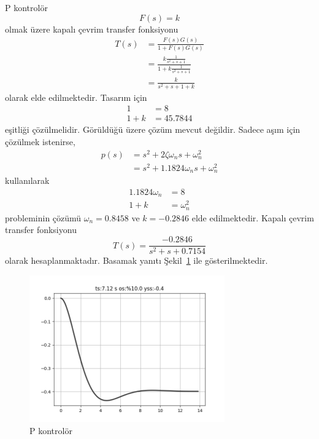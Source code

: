 P kontrolör
\begin{equation}
    F(s)=k
\end{equation}
olmak üzere kapalı çevrim transfer fonksiyonu 
\begin{equation}
\begin{split}
    T(s)&=\frac{F(s)G(s)}{1+F(s)G(s)}\\
    &=\frac{k\frac{1}{s^2+s+1}}{1+k\frac{1}{s^2+s+1}}\\
    &=\frac{k}{s^2+s+1+k}
\end{split}
\end{equation}
olarak elde edilmektedir. Tasarım için 
\begin{equation}
\begin{split}
    1&=8\\
    1+k&=45.7844
\end{split}
\end{equation}
eşitliği çözülmelidir. Görüldüğü üzere çözüm mevcut değildir. Sadece aşım için çözülmek istenirse, \begin{equation}
\begin{split}
    p(s)&=s^2+2\zeta \omega_n s+\omega_n^2\\
    &=s^2+1.1824\omega_n s+\omega_n^2
\end{split}
\end{equation}
kullanılarak 
\begin{equation}
\begin{split}
    1.1824\omega_n&=8\\
    1+k&=\omega_n^2
\end{split}
\end{equation}
probleminin çözümü $\omega_n=0.8458$ ve $k=-0.2846$ elde edilmektedir. Kapalı çevrim transfer fonksiyonu
\begin{equation}
    T(s)=\frac{-0.2846}{s^2 + s + 0.7154}
\end{equation}
olarak hesaplanmaktadır. Basamak yanıtı Şekil~\ref{fig:p_kontrol} ile gösterilmektedir.
\begin{figure}[!htb]
    \centering
    \includegraphics[width=0.75\textwidth]{p_kontrol}
    \caption{P kontrolör}
    \label{fig:p_kontrol}
\end{figure}